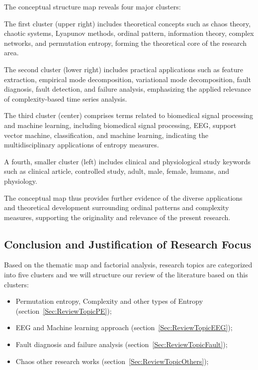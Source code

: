 The conceptual structure map reveals four major clusters:

The first cluster (upper right) includes theoretical concepts such as chaos theory, chaotic systems, Lyapunov methods, ordinal pattern, information theory, complex networks, and permutation entropy, forming the theoretical core of the research area.

The second cluster (lower right) includes practical applications such as feature extraction, empirical mode decomposition, variational mode decomposition, fault diagnosis, fault detection, and failure analysis, emphasizing the applied relevance of complexity-based time series analysis.

The third cluster (center) comprises terms related to biomedical signal processing and machine learning, including biomedical signal processing, EEG, support vector machine, classification, and machine learning, indicating the multidisciplinary applications of entropy measures.

A fourth, smaller cluster (left) includes clinical and physiological study keywords such as clinical article, controlled study, adult, male, female, humans, and physiology.

The conceptual map thus provides further evidence of the diverse applications and theoretical development surrounding ordinal patterns and complexity measures, supporting the originality and relevance of the present research.

\subsection{Conclusion and Justification of Research Focus}

Based on the thematic map and factorial analysis, research topics are categorized into five clusters and we will structure our review of the literature based on this clusters:

\begin{itemize}
	\item Permutation entropy, Complexity and other types of Entropy (section~\ref{Sec:ReviewTopicPE});
	\item EEG and Machine learning approach (section~\ref{Sec:ReviewTopicEEG});
	\item Fault diagnosis and failure analysis (section~\ref{Sec:ReviewTopicFault});
	\item Chaos other research works (section~\ref{Sec:ReviewTopicOthers});
\end{itemize}

